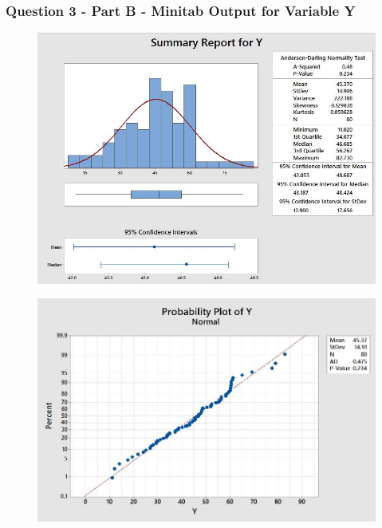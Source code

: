 \documentclass[a4paper,12pt]{article}
\begin{document}
\subsubsection*{Question 3 - Part B - Minitab Output for Variable Y}
\begin{figure}[h!]
	\centering
	\includegraphics[width=0.99\linewidth]{TestingNormality/NormalityTesting3}
\end{figure}
\begin{figure}[h!]
	\centering
	\includegraphics[width=0.99\linewidth]{TestingNormality/NormalityTesting4}
\end{figure}

\newpage
\end{document}
